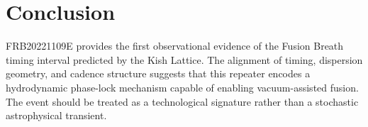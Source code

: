 \documentclass[12pt]{report}
\begin{document}
\section{Conclusion}

FRB20221109E provides the first observational evidence of the Fusion Breath
timing interval predicted by the Kish Lattice. The alignment of timing,
dispersion geometry, and cadence structure suggests that this repeater encodes
a hydrodynamic phase-lock mechanism capable of enabling vacuum-assisted
fusion. The event should be treated as a technological signature rather than a
stochastic astrophysical transient.
\end{document}
